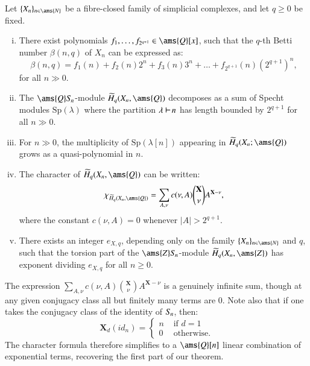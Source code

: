 \documentclass[matann2]{svjour1}
\def\Z{\ams{Z}}
\def\N{\ams{N}}
\def\Q{\ams{Q}}
\def\symn{S_{\kern-1pt n}}
\def\Sp{\mathrm{Sp}}
\def\partition{\,\,\begin{tikzpicture}
\draw[line width=0.7pt](0,0)--(0,0.2);
\draw[line width=0.7pt](0,0.1)--(0.175,0.1);
\end{tikzpicture}\,}
\newcommand{\Sym}[1]{S_{\kern-1pt {#1}}}
\begin{document}
\begin{theorem}
  \label{mainthm}
  Let $\{X_n\}_{n \in \N}$ be a fibre-closed family of simplicial
  complexes, and let $q \geq 0$ be fixed.
\begin{enumerate}[(i).]
\item There exist polynomials $f_1,\ldots,f_{2^{q+1}} \in \Q[x]$,
such that the $q$-th Betti number $\beta(n,q)$ of $X_n$ can be
expressed as:
        \[
        \beta(n,q) = f_1(n) + f_2(n)2^n + f_3(n)3^n + \ldots
        + f_{2^{q+1}}(n)(2^{q+1})^n,
        \]
for all $n \gg 0$.
\item The $\Q\symn$-module $\widetilde{H}_q(X_n,\Q)$ decomposes as a sum of
Specht modules $\Sp(\lambda)$ where the partition
$\lambda\partition n$ has length
bounded by $2^{q+1}$ for all $n \gg 0$.
\item 
For $n \gg 0$, the multiplicity of
$\Sp(\lambda[n])$ appearing
in $\widetilde{H}_q(X_n;\Q)$ grows as a quasi-polynomial in $n$.
\item The character of $\widetilde{H}_q(X_n,\Q)$ can be written:
\begin{align*}
  \chi_{\widetilde{H}_q(X_n,\Q)} =
  \sum_{A,\nu} c(\nu,A)\binom{\mathbf{X}}{\nu}A^{\mathbf{X}-\nu},
\end{align*}
where the constant $c(\nu,A) = 0$ whenever $|A| > 2^{q+1}$.
\item There exists an integer $e_{X,q}$,
depending only on the family $\{X_n\}_{n \in \N}$
and $q$, such that the torsion part of
the $\Z\symn$-module $\widetilde{H}_q(X_n,\Z)$
has exponent dividing $e_{X,q}$ for all $n\geq 0$.
\end{enumerate}
\end{theorem}

\begin{remark}
  The expression $\sum_{A,\nu} c(\nu,A)\binom{\mathbf{X}}{\nu}A^{\mathbf{X}-\nu}$
  is a genuinely infinite sum, though at any given conjugacy class all
  but finitely many terms are 0. Note also that if one takes the
  conjugacy class of the identity of $\Sym{n}$,
  then:
  $$\mathbf{X}_d(id_n) = \begin{cases}
        n &\text{ if $d = 1$}\\
        0 &\text{ otherwise.}
    \end{cases}$$
The character formula therefore simplifies to a $\Q[n]$ linear
  combination of exponential terms, recovering the first part of our theorem.
\end{remark}
\end{document}
